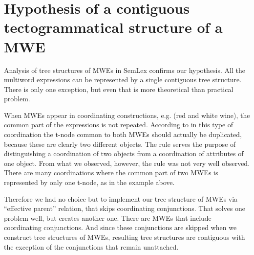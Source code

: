 %
%




\section{Hypothesis of a contiguous tectogrammatical structure of a MWE}
\label{contiguous}
Analysis of tree structures of MWEs in SemLex confirms our hypothesis. All the multiword expressions can be represented by a single contiguous tree structure. There is only one exception, but even that is more theoretical than practical problem. 

When MWEs appear in coordinating constructions, e.g.  (red and white wine), the common part of the expressions is not repeated. According to \citet{mikulova:2006} in this type of coordination the t-node common to both MWEs should actually be duplicated, because these are clearly two different objects. The rule serves the purpose of distinguishing a coordination of two objects from a  coordination of attributes of one object. From what we observed, however, the rule was not very well observed. There are many coordinations where the common part of two MWEs is represented by only one t-node, as in the example above. 

Therefore we had no choice but to implement our tree structure of MWEs via ``effective parent'' relation, that skips coordinating conjunctions. That solves one problem well, but creates another one. There are MWEs that include coordinating conjunctions. And since these conjunctions are skipped when we construct tree structures of MWEs, resulting tree structures are contiguous with the exception of the conjunctions that remain unattached. 

